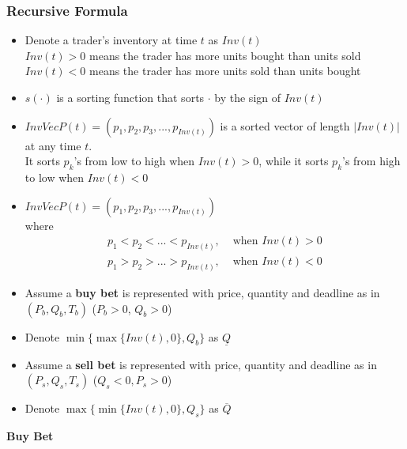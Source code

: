 \documentclass{article}
\begin{document}
\subsubsection*{Recursive Formula}
\begin{itemize}
    \item Denote a trader's inventory at time $t$ as $Inv(t)$ \\
    $Inv(t) > 0$ means the trader has more units bought than units sold \\
    $Inv(t) < 0$ means the trader has more units sold than units bought  
    \item $s(\cdot)$ is a sorting function that sorts $\cdot$ by the sign of $Inv(t)$ 
    \item $InvVecP(t) = (p_1, p_2, p_3, ..., p_{Inv(t)})$ is a sorted vector of length $|Inv(t)|$ at any time $t$. \\
    It sorts $p_k$'s from low to high when $Inv(t) > 0$, while it sorts $p_k$'s from high to low when $Inv(t) < 0$
    \item $InvVecP(t) = (p_1, p_2, p_3, ..., p_{Inv(t)})$ \\
    where 
    \begin{align*}
        p_1 < p_2 < ... < p_{Inv(t)}, & \text{ when } Inv(t) > 0\\
        p_1 > p_2 > ... > p_{Inv(t)}, & \text{ when } Inv(t) < 0
    \end{align*} 
    \item Assume a \textbf{buy bet} is represented with price, quantity and deadline as in $(P_b, Q_b, T_b)$ ($P_b > 0$, $Q_b > 0$)
    \item Denote $\min\{\max \{Inv(t), 0\}, Q_b\}$ as $\underline{Q}$
    \item Assume a \textbf{sell bet} is represented with price, quantity and deadline as in $(P_s, Q_s, T_s)$ ($Q_s < 0, P_s > 0$) 
    \item Denote $\max\{\min \{Inv(t), 0\}, Q_s\}$ as $\overline{Q}$
\end{itemize}

\noindent 
\textbf{Buy Bet} 
\end{document}
